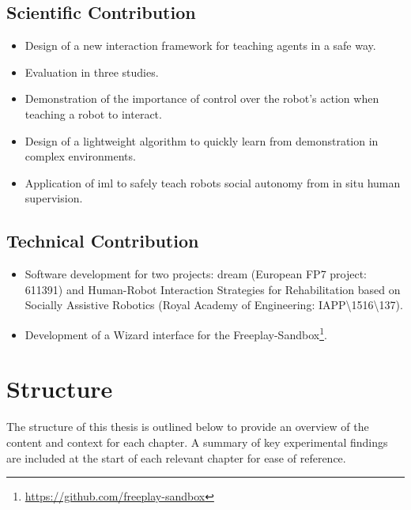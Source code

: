 \subsection{Scientific Contribution}
\begin{itemize}
	\item Design of a new interaction framework for teaching agents in a safe way.
	\item Evaluation in three studies.
	\item Demonstration of the importance of control over the robot's action when teaching a robot to interact.
	\item Design of a lightweight algorithm to quickly learn from demonstration in complex environments.
	\item Application of \gls{iml} to safely teach robots social autonomy from in situ human supervision. 
\end{itemize}

\subsection{Technical Contribution}
\begin{itemize}
	\item Software development for two projects: \acrshort{dream} (European FP7 project: 611391) and Human-Robot Interaction Strategies for Rehabilitation based on Socially Assistive Robotics (Royal Academy of Engineering: IAPP\textbackslash1516\textbackslash137).
	\item Development of a Wizard interface for the Freeplay-Sandbox\footnote{\url{https://github.com/freeplay-sandbox}}. 
\end{itemize}
	
\section{Structure}\label{sec:intro-struct}
The structure of this thesis is outlined below to provide an overview of the content and context for each chapter. A summary of key experimental findings are included at the start of each relevant chapter for ease of reference. 

